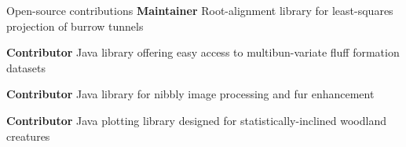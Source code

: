 \begin{rubric}{Open-source contributions}
	\textbf{Maintainer} Root-alignment library for least-squares projection of burrow tunnels
	
	\textbf{Contributor} Java library offering easy access to multibun-variate fluff formation datasets
	
	\textbf{Contributor} Java library for nibbly image processing and fur enhancement
	
	\textbf{Contributor} Java plotting library designed for statistically-inclined woodland creatures
\end{rubric}